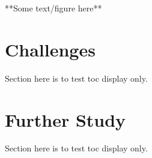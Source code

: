 %
%
%



\label{cha:Summary}

**Some text/figure here**

\section{Challenges}
Section here is to test toc display only.

\section{Further Study}
Section here is to test toc display only.

